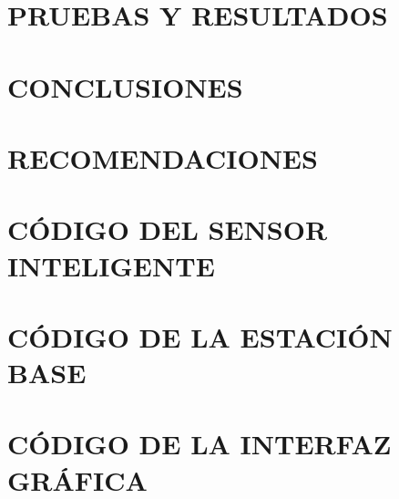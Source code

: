 \documentclass[letterpaper,titlepage,12pt,oneside,spanish,final]{report_eie}
\begin{document}
\chapter{PRUEBAS Y RESULTADOS}\label{CAP:pruebas}


\chapter{CONCLUSIONES}\label{CAP:conclu}


\chapter{RECOMENDACIONES}\label{CAP:recomendaciones}



\appendix

\renewcommand \thechapter{\Roman{chapter}}
\chapter{CÓDIGO DEL SENSOR INTELIGENTE}\label{CAP:anexo0}
%

\chapter{CÓDIGO DE LA ESTACIÓN BASE}\label{CAP:anexo1}


\chapter{CÓDIGO DE LA INTERFAZ GRÁFICA}\label{CAP:anexo2}
%

\end{document}
